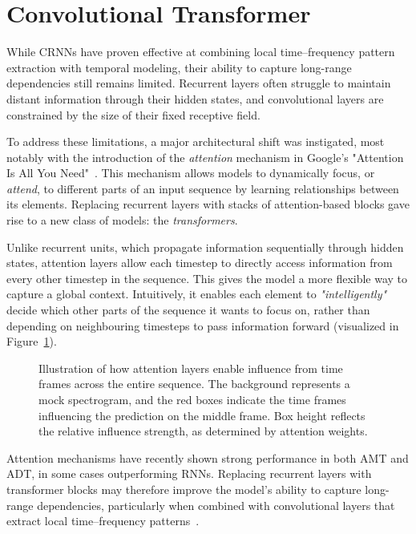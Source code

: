 \section{Convolutional Transformer}

While \glspl{CRNN} have proven effective at combining local time–frequency pattern extraction with temporal modeling, their ability to capture long-range dependencies still remains limited. Recurrent layers often struggle to maintain distant information through their hidden states, and convolutional layers are constrained by the size of their fixed receptive field.

To address these limitations, a major architectural shift was instigated, most notably with the introduction of the \textit{attention} mechanism in Google's "Attention Is All You Need"~\cite{NIPS2017_3f5ee243}. This mechanism allows models to dynamically focus, or \textit{attend}, to different parts of an input sequence by learning relationships between its elements. Replacing recurrent layers with stacks of attention-based blocks gave rise to a new class of models: the \textit{transformers}.

Unlike recurrent units, which propagate information sequentially through hidden states, attention layers allow each timestep to directly access information from every other timestep in the sequence. This gives the model a more flexible way to capture a global context. Intuitively, it enables each element to \textit{"intelligently"} decide which other parts of the sequence it wants to focus on, rather than depending on neighbouring timesteps to pass information forward (visualized in Figure~\ref{CTInfluenceFigure}).

\begin{figure}[H]
    \centering
    
    \caption{Illustration of how attention layers enable influence from time frames across the entire sequence. The background represents a mock spectrogram, and the red boxes indicate the time frames influencing the prediction on the middle frame. Box height reflects the relative influence strength, as determined by attention weights.}
    \label{CTInfluenceFigure}
\end{figure}

Attention mechanisms have recently shown strong performance in both \gls{AMT} and \gls{ADT}, in some cases outperforming \glspl{RNN}. Replacing recurrent layers with transformer blocks may therefore improve the model's ability to capture long-range dependencies, particularly when combined with convolutional layers that extract local time–frequency patterns~\cite{9747048, gardner2022mt3multitaskmultitrackmusic, signals4040042, chang2024yourmt3+, zehren2024analyzingreducingsynthetictorealtransfer}.


